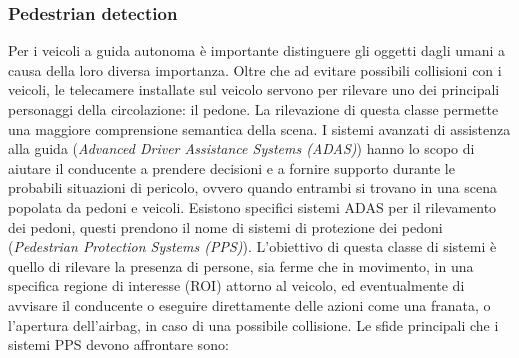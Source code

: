 \subsubsection{Pedestrian detection}
Per i veicoli a guida autonoma è importante distinguere gli oggetti dagli 
umani a causa della loro diversa importanza. Oltre che ad evitare possibili 
collisioni con i veicoli, le telecamere installate sul veicolo servono per 
rilevare uno dei principali personaggi della circolazione: il pedone. La rilevazione di 
questa classe permette una maggiore comprensione semantica della scena. I 
sistemi avanzati di assistenza alla guida (\emph{Advanced Driver Assistance Systems 
(ADAS)}) hanno lo scopo di aiutare il conducente a prendere decisioni 
e a fornire supporto durante le probabili situazioni di pericolo,  ovvero quando 
entrambi si trovano in una scena popolata da pedoni e veicoli. Esistono 
specifici sistemi ADAS per il rilevamento dei pedoni, questi prendono il 
nome di sistemi di protezione dei pedoni (\emph{Pedestrian Protection Systems 
(PPS)}). L'obiettivo di questa classe di sistemi è quello di rilevare la presenza 
di persone, sia ferme che in movimento, in una specifica regione di interesse 
(ROI) attorno al veicolo, ed eventualmente di avvisare il conducente  o eseguire 
direttamente delle azioni come una franata, o l'apertura dell'airbag, 
in caso di una possibile collisione. Le sfide principali che i sistemi PPS devono 
affrontare sono:
